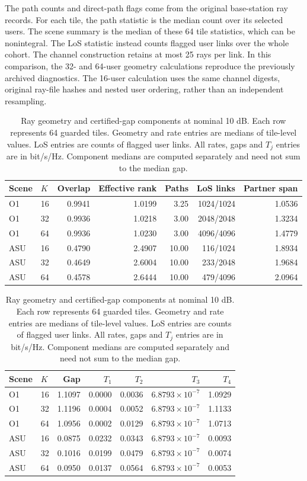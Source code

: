 The path counts and direct-path flags come from the original base-station ray records. For each tile, the path statistic is the median count over its selected users. The scene summary is the median of these 64 tile statistics, which can be nonintegral. The LoS statistic instead counts flagged user links over the whole cohort. The channel construction retains at most 25 rays per link. In this comparison, the 32- and 64-user geometry calculations reproduce the previously archived diagnostics. The 16-user calculation uses the same channel digests, original ray-file hashes and nested user ordering, rather than an independent resampling.

\begin{table}[htbp]
\centering
\caption{Ray geometry and certified-gap components at nominal 10 dB. Each row represents 64 guarded tiles. Geometry and rate entries are medians of tile-level values. LoS entries are counts of flagged user links. All rates, gaps and \(T_j\) entries are in bit/s/Hz. Component medians are computed separately and need not sum to the median gap.}
\label{supp:table6}
\small
\begin{tabular}{llrrrrr}
\hline
Scene & \(K\) & Overlap & Effective rank & Paths & LoS links & Partner span\\
\hline
O1 &16&0.9941&1.0199&3.25&1024/1024&1.0536\\
O1 &32&0.9936&1.0218&3.00&2048/2048&1.3234\\
O1 &64&0.9936&1.0230&3.00&4096/4096&1.4779\\
ASU &16&0.4790&2.4907&10.00&116/1024&1.8934\\
ASU &32&0.4649&2.6004&10.00&233/2048&1.9684\\
ASU &64&0.4578&2.6444&10.00&479/4096&2.0964\\
\hline
\end{tabular}

\medskip
\begin{tabular}{llrrrrr}
\hline
Scene & \(K\) & Gap & \(T_1\) & \(T_2\) & \(T_3\) & \(T_4\)\\
\hline
O1 &16&1.1097&0.0000&0.0036&\(6.8793\times10^{-7}\)&1.0929\\
O1 &32&1.1196&0.0004&0.0052&\(6.8793\times10^{-7}\)&1.1133\\
O1 &64&1.0956&0.0002&0.0129&\(6.8793\times10^{-7}\)&1.0713\\
ASU &16&0.0875&0.0232&0.0343&\(6.8793\times10^{-7}\)&0.0093\\
ASU &32&0.1016&0.0199&0.0479&\(6.8793\times10^{-7}\)&0.0074\\
ASU &64&0.0950&0.0137&0.0564&\(6.8793\times10^{-7}\)&0.0053\\
\hline
\end{tabular}
\end{table}


